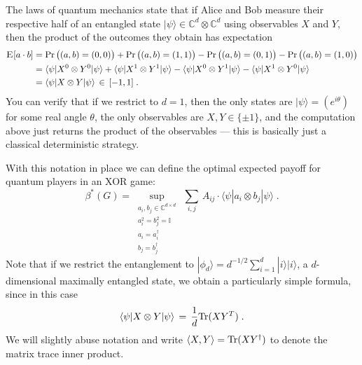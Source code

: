 \documentclass{report}
\theoremstyle{plain}
\theoremstyle{definition}
\theoremstyle{remark}
\newcommand{\ket}[1]{|#1\rangle}
\newcommand{\bra}[1]{\langle#1|}
\newcommand{\Tr}{\mbox{\rm Tr}}
\newcommand{\Es}[1]{\textsc{E}_{#1}}
\newcommand{\C}{\ensuremath{\mathbb{C}}}
\numberwithin{equation}{subsection}
\begin{document}
 The laws of quantum mechanics state that if Alice and Bob measure their respective half of an entangled state $\ket{\psi} \in \C^d \otimes \C^d$ using observables $X$ and $Y$, then the product of the outcomes they obtain has expectation
\begin{align*}
\Es{}[a\cdot b] &= \Pr\big( (a,b)=(0,0) \big) + \Pr\big( (a,b)=(1,1) \big) - \Pr\big( (a,b)=(0,1) \big)  - \Pr\big( (a,b)=(1,0) \big) \\
&=  \bra{\psi} X^0 \otimes Y^0 \ket{\psi} + \bra{\psi} X^1 \otimes Y^1 \ket{\psi} - \bra{\psi} X^0 \otimes Y^1 \ket{\psi} - \bra{\psi} X^1 \otimes Y^0 \ket{\psi}\\
&=  \bra{\psi} X \otimes Y \ket{\psi} \,\in\,[-1,1]\;.
\end{align*}
You can verify that if we restrict to $d=1$, then the only states are $\ket{\psi} = (e^{i\theta})$ for some real angle $\theta$, the only observables are $X,Y\in\{\pm 1\}$, and the computation above just returns the product of the observables --- this is basically just a classical deterministic strategy. 

With this notation in place we can define the optimal expected payoff for quantum players in an XOR game: 
\begin{equation}\label{eq:def-qval}  
\beta^*(G)=\sup_{\substack{a_i,b_j\in\C^{d\times d}\\ a_i^2=b_j^2=\mathbb{I}\\ a_i=a_i^\dagger\\ b_j=b_j^\dagger}}\,\sum_{i,j}\, A_{ij}\cdot\bra{\psi} a_i\otimes b_j\ket{\psi}\;.
\end{equation}
Note that if we restrict the entanglement to $\ket{\phi_{d}} = d^{-1/2}\sum_{i=1}^d \ket{i}\ket{i}$, a $d$-dimensional maximally entangled state, we obtain a particularly simple formula, since in this case
 $$\bra{\psi} X\otimes Y \ket{\psi} \,=\, \frac{1}{d} \Tr(XY^T)\;.$$
We will slightly abuse notation and write  $\langle X, Y\rangle = \Tr(XY^\dagger)$ to denote the matrix trace inner product. 
\end{document}
